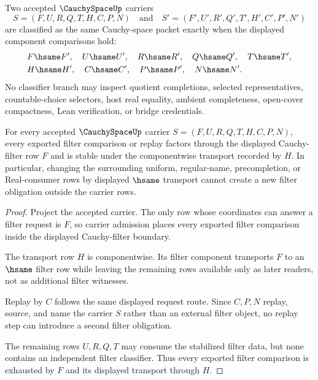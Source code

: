 \begin{definition}
\label{def:cauchyspace-classifier}
Two accepted $\CauchySpaceUp$ carriers
$$
S=(F,U,R,Q,T,H,C,P,N)
\quad\text{and}\quad
S'=(F',U',R',Q',T',H',C',P',N')
$$
are classified as the same Cauchy-space packet exactly when the displayed component comparisons hold:
$$
\begin{aligned}
&F \hsame F',
\quad
U \hsame U',
\quad
R \hsame R',
\quad
Q \hsame Q',
\quad
T \hsame T',
\\
&H \hsame H',
\quad
C \hsame C',
\quad
P \hsame P',
\quad
N \hsame N'.
\end{aligned}
$$
No classifier branch may inspect quotient completions, selected representatives, countable-choice selectors, host real equality, ambient completeness, open-cover compactness, Lean verification, or bridge credentials.
\end{definition}

\begin{theorem}
\label{thm:cauchyspace-filter-stability}
For every accepted $\CauchySpaceUp$ carrier $S=(F,U,R,Q,T,H,C,P,N)$, every exported filter comparison or replay factors through the displayed Cauchy-filter row $F$ and is stable under the componentwise transport recorded by $H$. In particular, changing the surrounding uniform, regular-name, precompletion, or Real-consumer rows by displayed $\hsame$ transport cannot create a new filter obligation outside the carrier rows.
\end{theorem}
\begin{proof}
Project the accepted carrier. The only row whose coordinates can answer a filter request is $F$, so carrier admission places every exported filter comparison inside the displayed Cauchy-filter boundary.

The transport row $H$ is componentwise. Its filter component transports $F$ to an $\hsame$ filter row while leaving the remaining rows available only as later readers, not as additional filter witnesses.

Replay by $C$ follows the same displayed request route. Since $C,P,N$ replay, source, and name the carrier $S$ rather than an external filter object, no replay step can introduce a second filter obligation.

The remaining rows $U,R,Q,T$ may consume the stabilized filter data, but none contains an independent filter classifier. Thus every exported filter comparison is exhausted by $F$ and its displayed transport through $H$.
\end{proof}

